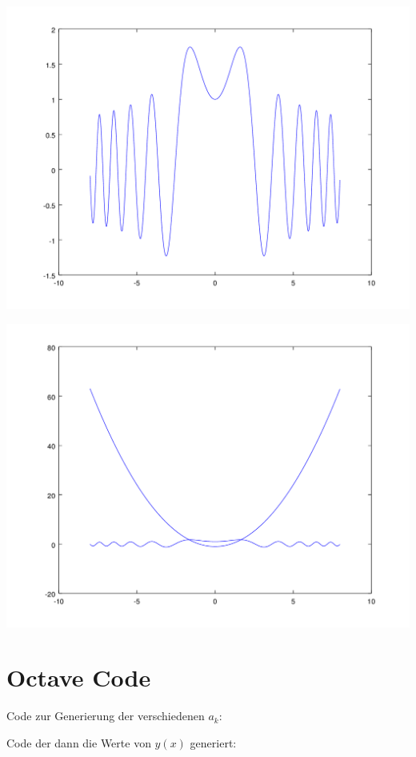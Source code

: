 \begin{refsection}
\includegraphics[scale=0.6]{./wellen/octave/images/welle.png}

\includegraphics[scale=0.6]{./wellen/octave/images/wellewithparabel.png}

\clearpage
\section{Octave Code}
Code zur Generierung der verschiedenen $a_k$:


Code der dann die Werte von $y(x)$ generiert:

\printbibliography[heading=subbibliography]
\end{refsection}